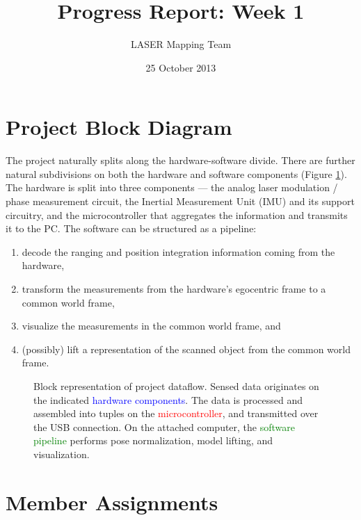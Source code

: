 \documentclass{article}
\title{Progress Report: Week 1}
\author{LASER Mapping Team}
\date{25 October 2013}
\begin{document}
\maketitle

\section{Project Block Diagram}

The project naturally splits along the hardware-software divide.  There are
further natural subdivisions on both the hardware and software components
(Figure \ref{fig:project-block-diagram}).  The hardware is split into three
components --- the analog laser modulation / phase measurement circuit, the
Inertial Measurement Unit (IMU) and its support circuitry, and the
microcontroller that aggregates the information and transmits it to the PC.  The
software can be structured as a pipeline:
\begin{enumerate}
\item decode the ranging and position integration information coming from the
  hardware,
\item transform the measurements from the hardware's egocentric frame to a
  common world frame,
\item visualize the measurements in the common world frame, and
\item (possibly) lift a representation of the scanned object from the common
  world frame.
\end{enumerate}

\begin{figure}
  \centering
  
  \caption{Block representation of project dataflow.  Sensed data originates on
    the indicated \textcolor{blue}{hardware components}.  The data is processed
    and assembled into tuples on the \textcolor{red}{microcontroller}, and
    transmitted over the USB connection.  On the attached computer, the
    \textcolor{green}{software pipeline} performs pose normalization, model
    lifting, and visualization.}
  \label{fig:project-block-diagram}
\end{figure}

\section{Member Assignments}
\end{document}
